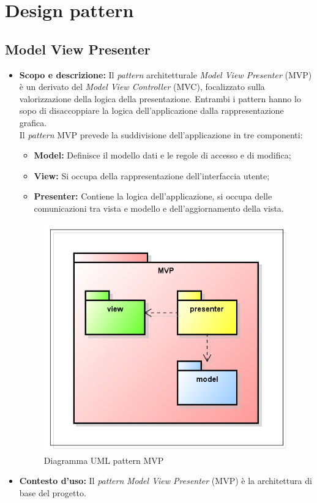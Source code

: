 \section{Design pattern}

\subsection{Model View Presenter}
\begin{itemize}
\item \textbf{Scopo e descrizione:}
Il \textit{pattern} architetturale \textit{Model View Presenter} (MVP) è un derivato del \textit{Model View Controller} (MVC), focalizzato sulla valorizzazione della logica della presentazione. Entrambi i pattern hanno lo sopo di disaccoppiare la logica dell'applicazione dalla rappresentazione grafica.\\
Il \textit{pattern} MVP prevede la suddivisione dell'applicazione in tre componenti:
\begin{itemize}
\item \textbf{Model:} Definisce il modello dati e le regole di accesso e di modifica;
\item \textbf{View:} Si occupa della rappresentazione dell'interfaccia utente;
\item \textbf{Presenter:} Contiene la logica dell'applicazione, si occupa delle comunicazioni tra vista e modello e dell'aggiornamento della vista.
\end{itemize}
\begin{figure}[H] \centering \includegraphics[scale=1]{./pattern/mvp.png} \caption{Diagramma UML pattern MVP}
\end{figure}
\item \textbf{Contesto d'uso:}
Il \textit{pattern} \textit{Model View Presenter} (MVP) è la architettura di base del progetto.
\end{itemize}

